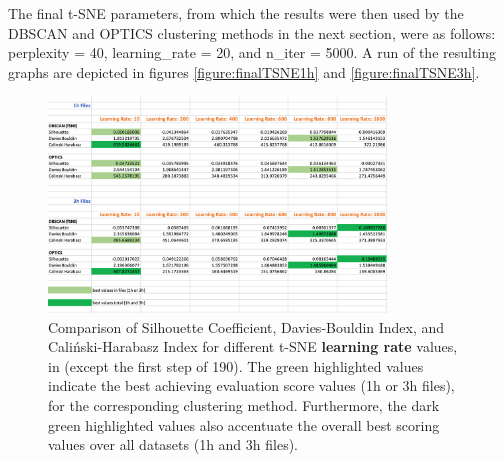 The final t-SNE parameters, from which the results were then used by the DBSCAN and OPTICS clustering methods in the next section, were as follows: perplexity = 40, learning\_rate = 20, and n\_iter = 5000. A run of the resulting graphs are depicted in figures \ref{figure:finalTSNE1h} and \ref{figure:finalTSNE3h}.


\begin{figure}
  \centering
  \includegraphics[width=0.8\textwidth]{./images/tsneParametersTest/learningRate/learningRateEvaluationScores.png}
  \caption{Comparison of Silhouette Coefficient, Davies-Bouldin Index, and Caliński-Harabasz Index for different t-SNE \textbf{learning rate} values, in  (except the first step of 190). The green highlighted values indicate the best achieving evaluation score values (1h or 3h files), for the corresponding clustering method. Furthermore, the dark green highlighted values also accentuate the overall best scoring values over all datasets (1h and 3h files).}
  \label{figure:learningRateEvaluationScores}
\end{figure}


